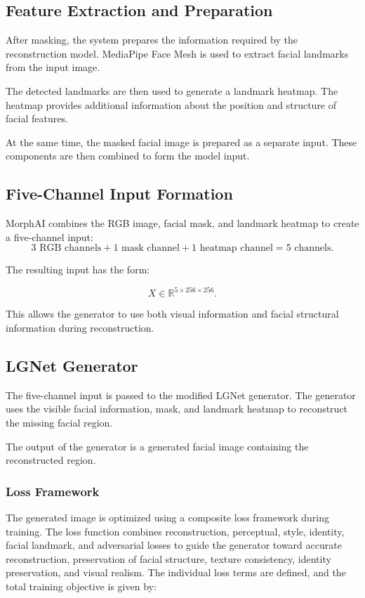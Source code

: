 \subsection{Feature Extraction and Preparation}

After masking, the system prepares the information required by the reconstruction model. MediaPipe Face Mesh is used to extract facial landmarks from the input image.

\noindent The detected landmarks are then used to generate a landmark heatmap. The heatmap provides additional information about the position and structure of facial features.

\noindent At the same time, the masked facial image is prepared as a separate input. These components are then combined to form the model input.

\clearpage
\subsection{Five-Channel Input Formation}

MorphAI combines the RGB image, facial mask, and landmark heatmap to create a five-channel input:
\begin{equation}
3\text{ RGB channels} + 1\text{ mask channel} + 1\text{ heatmap channel}
= 5\text{ channels}.
\end{equation}

\noindent The resulting input has the form:

\begin{equation}
X \in \mathbb{R}^{5 \times 256 \times 256}.
\end{equation}

\noindent This allows the generator to use both visual information and facial structural information during reconstruction.

\subsection{LGNet Generator}

The five-channel input is passed to the modified LGNet generator. The generator uses the visible facial information, mask, and landmark heatmap to reconstruct the missing facial region.

\noindent The output of the generator is a generated facial image containing the reconstructed region.

\subsubsection{Loss Framework}
The generated image is optimized using a composite loss framework during
training. The loss function combines reconstruction, perceptual, style,
identity, facial landmark, and adversarial losses to guide the generator
toward accurate reconstruction, preservation of facial structure, texture
consistency, identity preservation, and visual realism. The individual
loss terms are defined, and the total
training objective is given by:

